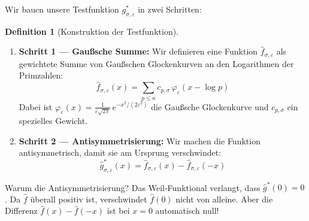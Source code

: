 \documentclass[11pt,a4paper]{article}
\theoremstyle{plain}
\theoremstyle{definition}
\newtheorem{definition}[theorem]{Definition}
\theoremstyle{remark}
\begin{document}
	Wir bauen unsere Testfunktion $g^*_{\sigma,\varepsilon}$ in zwei Schritten:
	
	\begin{definition}[Konstruktion der Testfunktion]
		\begin{enumerate}
			\item \textbf{Schritt 1 --- Gau\ss sche Summe:}
			Wir definieren eine Funktion $\hat{f}_{\sigma,\varepsilon}$ als gewichtete
			Summe von Gau\ss schen Glockenkurven an den Logarithmen der Primzahlen:
			\begin{equation}
				\hat{f}_{\sigma,\varepsilon}(x)
				= \sum_{p \leq \kappa} c_{p,\sigma}\, \varphi_{\varepsilon}(x - \log p)
			\end{equation}
			Dabei ist $\varphi_{\varepsilon}(x) = \frac{1}{\varepsilon\sqrt{2\pi}}\,
			e^{-x^2/(2\varepsilon^2)}$ die Gau\ss sche Glockenkurve und $c_{p,\sigma}$
			ein spezielles Gewicht.
			
			\item \textbf{Schritt 2 --- Antisymmetrisierung:}
			Wir machen die Funktion antisymmetrisch, damit sie am Ursprung verschwindet:
			\begin{equation}
				\hat{g}^*_{\sigma,\varepsilon}(x)
				= \hat{f}_{\sigma,\varepsilon}(x) - \hat{f}_{\sigma,\varepsilon}(-x)
			\end{equation}
		\end{enumerate}
	\end{definition}
	
	Warum die Antisymmetrisierung? Das Weil-Funktional verlangt, dass $\hat{g}^*(0) = 0$.
	Da $\hat{f}$ \"uberall positiv ist, verschwindet $\hat{f}(0)$ nicht von alleine.
	Aber die Differenz $\hat{f}(x) - \hat{f}(-x)$ ist bei $x=0$ automatisch null!
	
	\begin{center}
	\end{center}
	
\end{document}
